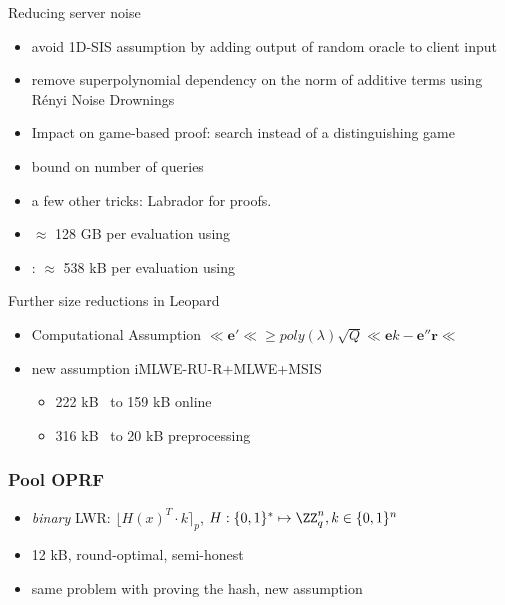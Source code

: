 \documentclass[aspectratio=169, 12pt,handout]{beamer}
\newcommand{\bv}[1]{\mathbf{#1}}
\begin{document}

\begin{frame}{Reducing server noise~\cite{AC:AlbGur24}}
  \begin{itemize}
    \item avoid 1D-SIS assumption by adding output of random oracle to client
      input
    \item remove superpolynomial dependency on the norm of
      additive terms using Rényi Noise Drownings \pause
    \item Impact on game-based proof: 
      search
      instead of a distinguishing game\pause
    \item bound on number of queries
    \item a few other tricks: Labrador for proofs. \pause
    \item \cite{PKC:ADDS21} $\approx$ 128 GB per evaluation using \cite{C:YAZXYW19}\pause
    \item \cite{AC:AlbGur24}: $\approx$ 538 kB per evaluation using \cite{C:BeuSei23}
  \end{itemize}
\end{frame}


\begin{frame}{Further size reductions in Leopard~\cite{EPRINT:ESTX24}}
  \begin{itemize}
    \item 
      Computational Assumption $\ll\bv{e'}\ll \geq poly(\lambda)\sqrt{Q}\ll
      \bv{e}k-\bv{e''}\bv{r}\ll$ \cite{EPRINT:ESTX24}\pause
    \item 
      new assumption iMLWE-RU-R+MLWE+MSIS\pause
  \begin{itemize}
    \item 222 kB~\cite{AC:AlbGur24} to 159 kB online\pause 
    \item 316 kB~\cite{AC:AlbGur24} to 20 kB preprocessing
  \end{itemize}
  \end{itemize}
\end{frame}


\begin{frame}
  \frametitle{Pool OPRF~\cite{CCS:DavDeoThi25}}
  \begin{itemize}
    \item \emph{binary} LWR: $\lfloor H(x)^T\cdot k\rceil_p$, $H:
      \{0,1\}^*\mapsto \ZZ_q^n, k\in \{0,1\}^n$\pause
    \item 12 kB, round-optimal, semi-honest\pause
    \item same problem with proving the hash, new assumption
  \end{itemize}
\end{frame}
\end{document}
